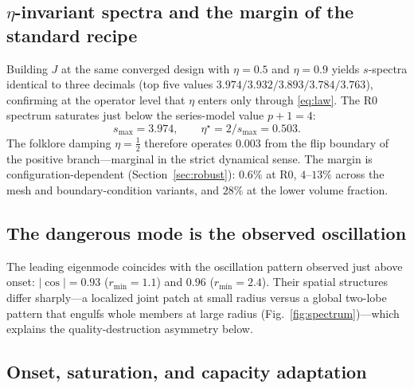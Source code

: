 \documentclass[11pt,a4paper]{article}
\newcommand{\smax}{s_{\max}}
\newcommand{\etastar}{\eta^{\star}}
\begin{document}
\subsection{$\eta$-invariant spectra and the margin of the standard
recipe}\label{sec:spectrum}

Building $J$ at the same converged design with $\eta=0.5$ and $\eta=0.9$
yields $s$-spectra identical to three decimals (top five values
$3.974/3.932/3.893/3.784/3.763$), confirming at the operator level that
$\eta$ enters only through \eqref{eq:law}. The R0 spectrum saturates just
below the series-model value $p{+}1=4$:
\begin{equation}
  \smax = 3.974, \qquad \etastar = 2/\smax = 0.503 .
\end{equation}
The folklore damping $\eta=\tfrac12$ therefore operates $0.003$ from the
flip boundary of the positive branch---marginal in the strict dynamical
sense. The margin is configuration-dependent (Section~\ref{sec:robust}):
$0.6\%$ at R0, $4$--$13\%$ across the mesh and boundary-condition
variants, and $28\%$ at the lower volume fraction.

\subsection{The dangerous mode is the observed oscillation}
\label{sec:modes}

The leading eigenmode coincides with the oscillation pattern observed just
above onset: $|\cos|=0.93$ ($r_{\min}=1.1$) and $0.96$ ($r_{\min}=2.4$).
Their spatial structures differ sharply---a localized joint patch at small
radius versus a global two-lobe pattern that engulfs whole members at
large radius (Fig.~\ref{fig:spectrum})---which explains the
quality-destruction asymmetry below.

\subsection{Onset, saturation, and capacity adaptation}
\label{sec:capacity}
\end{document}
